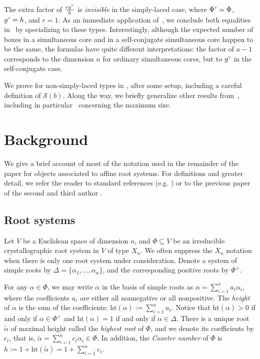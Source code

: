 \documentclass[ALCO,published]{cedram}
\newcommand{\darkblue}{\color{darkblue}} %
\newcommand{\defn}[1]{\emph{\darkblue #1}}
\newcommand{\chk}[1]{#1^{\normalfont\smash{\scalebox{.5}[.5]{\rotatebox{90}{\textbf{\textless}}}}}}
\newcommand{\h}{\mathrm{ht}}
\newcommand{\Sommers}{\mathcal{S}}
\newcommand{\amax}{\tilde{\alpha}}
\begin{document}
The extra factor of $\frac{r\chk{g}}{h}$ is \emph{invisible} in the simply-laced case, where $\chk{\Phi}=\Phi$, $\chk{g}=h$, and $r=1$.  As an immediate application of~, we conclude both equalities in~ by specializing to these types.    Interestingly, although the expected number of boxes in a simultaneous core and in a self-conjugate simultaneous core happen to be the same, the formulas have quite different interpretations: the factor of $a-1$ corresponds to the dimension $n$ for ordinary simultaneous cores, but to $\chk{g}$ in the self-conjugate case.   

We prove  for non-simply-laced types in , after some setup, including a careful definition of $\Sommers(b)$. Along the way, we briefly generalize other results from~\cite{thiel2017strange}, including in particular~ concerning the maximum size.





\section{Background}

We give a brief account of most of the notation used in the remainder of the paper for objects associated to affine root systems. For definitions and greater detail, we refer the reader to standard references (e.g. \cite{humphreys1992reflection}) or to the previous paper of the second and third author \cite[Section 2]{thiel2017strange}.


\subsection{Root systems}
\label{sec:root_systems}

Let $V$ be a Euclidean space of dimension $n$, and $\Phi\subseteq V$ be an irreducible crystallographic root system in $V$ of type $X_n$.  We often suppress the $X_n$ notation when there is only one root system under consideration.  Denote a system of simple roots by $\Delta=\{\alpha_1,\dots, \alpha_n\}$, and the corresponding positive roots by $\Phi^+$.

For any $\alpha\in\Phi$, we may write $\alpha$ in the basis of simple roots as $\alpha=\sum_{i=1}^n a_i\alpha_i$, where the coefficients $a_i$ are either all nonnegative or all nonpositive. The \defn{height} of $\alpha$ is the sum of the coefficients:
$\h(\alpha):=\sum_{i=1}^n a_i$.
Notice that $\h(\alpha)>0$ if and only if $\alpha\in\Phi^+$ and $\h(\alpha)=1$ if and only if $\alpha\in\Delta$.
There is a unique root $\amax$ of maximal height called the \defn{highest root} of $\Phi$, and we denote its coefficients by $c_i$, that is, $\amax =\sum_{i=1}^n c_i\alpha_i \in\Phi$. In addition, the \defn{Coxeter number} of $\Phi$ is $h:=1+\h(\amax)=1+\sum_{i=1}^n c_i$.
\end{document}
